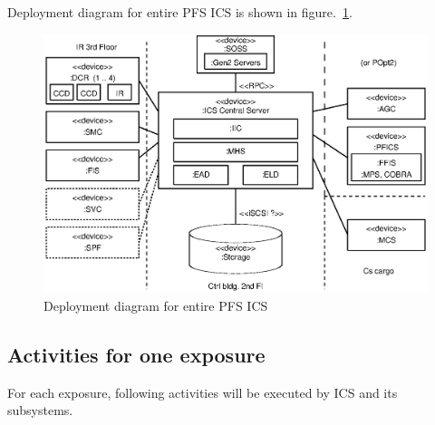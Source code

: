 \documentclass[a4paper,notitlepage]{article}
\begin{document}
Deployment diagram for entire PFS ICS is shown in 
figure.~\ref{fig:deploy-diagram}. 

\begin{figure}[htb]
  \begin{center}
    \includegraphics[scale=0.75]{deploy-diagram.eps}
  \end{center}
  \caption{Deployment diagram for entire PFS ICS}
  \label{fig:deploy-diagram}
\end{figure}


\subsection{Activities for one exposure}

For each exposure, following activities will be executed by ICS and its 
subsystems. 
\end{document}
